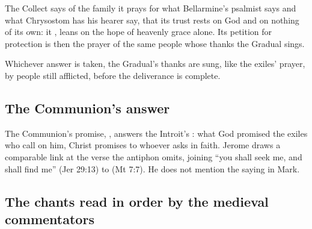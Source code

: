 The Collect says of the family it prays for what Bellarmine's psalmist says
and what Chrysostom has his hearer say, that its trust rests on God and on
nothing of its own: it , leans
on the hope of heavenly grace alone. Its petition for protection is then the prayer
of the same people whose thanks the Gradual sings.

Whichever answer is taken, the Gradual's thanks are sung, like the exiles'
prayer, by people still afflicted, before the deliverance is complete.

\subsection{The Communion's answer}
\label{sec:captivity-communion}

The Communion's promise, , answers the Introit's : what God promised the exiles who call on him, Christ
promises to whoever asks in faith. Jerome draws a comparable link at the
verse the antiphon omits, joining ``you shall seek me, and shall find me''
(Jer 29:13) to  (Mt 7:7). He does not mention the
saying in Mark.

\subsection{The chants read in order by the medieval commentators}
\label{sec:captivity-commentators}

